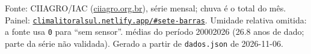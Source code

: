 \documentclass[10pt,a4paper]{article}
\begin{document}
\vspace{1pt}
{\tiny\color{cinza}
Fonte: CIIAGRO/IAC (\href{http://ciiagro.org.br}{ciiagro.org.br}), série mensal;
chuva é o total do mês. Painel:
\href{https://climalitoralsul.netlify.app/\#sete-barras}%
{\texttt{climalitoralsul.netlify.app/\#sete-barras}}.
Umidade relativa omitida: a fonte usa \texttt{0} para ``sem sensor''. 
médias do período 2000\textendash{}2026 (26.8 anos de dado; parte da série não validada).
Gerado a partir de \texttt{dados.json} de 2026-11-06.}
\end{document}
